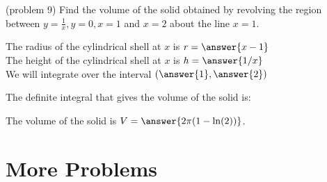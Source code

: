 \documentclass{ximera}
\begin{document}
\begin{problem}(problem 9)
Find the volume of the solid obtained by revolving the region between $y= \frac{1}{x}, y = 0, x = 1$ and $x=2$ about the line $x = 1$.


The radius of the cylindrical shell at $x$ is $r = \answer{x-1}$\\
The height of the cylindrical shell at $x$ is $h = \answer{1/x}$\\

We will integrate over the interval $\left(\answer{1},\answer{2}\right)$

The definite integral that gives the volume of the solid is:\\
\begin{multipleChoice}
\end{multipleChoice}

The volume of the solid is $V = \answer{2\pi(1-\ln(2)) }$.

\end{problem}

\begin{center}
\begin{foldable}
\end{foldable}
\end{center}



\section{More Problems}
\end{document}
